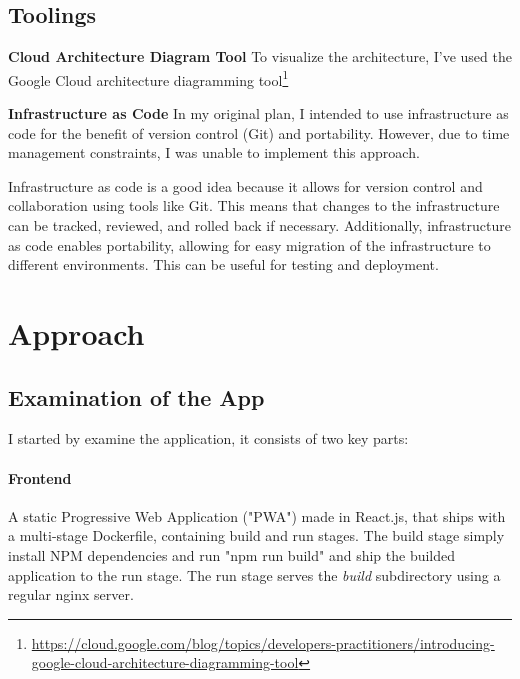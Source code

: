 \documentclass[11pt]{article}
\begin{document}
\subsection{Toolings}

\textbf{Cloud Architecture Diagram Tool}
To visualize the architecture, I've used the Google Cloud architecture diagramming tool\footnote{\href{https://cloud.google.com/blog/topics/developers-practitioners/introducing-google-cloud-architecture-diagramming-tool}{https://cloud.google.com/blog/topics/developers-practitioners/introducing-google-cloud-architecture-diagramming-tool}}


\textbf{Infrastructure as Code}\newline
In my original plan, I intended to use infrastructure as code for the benefit of version control (Git) and portability. However, due to time management constraints, I was unable to implement this approach.

Infrastructure as code is a good idea because it allows for version control and collaboration using tools like Git. This means that changes to the infrastructure can be tracked, reviewed, and rolled back if necessary. Additionally, infrastructure as code enables portability, allowing for easy migration of the infrastructure to different environments. This can be useful for testing and deployment.

\section{Approach}

\subsection{Examination of the App}
I started by examine the application, it consists of two key parts:

\paragraph{Frontend}
A static Progressive Web Application ("PWA") made in React.js, that ships with a multi-stage Dockerfile, containing build and run stages. The build stage simply install NPM dependencies and run "npm run build" and ship the builded application to the run stage. The run stage serves the \textit{build} subdirectory using a regular nginx server.
\end{document}
